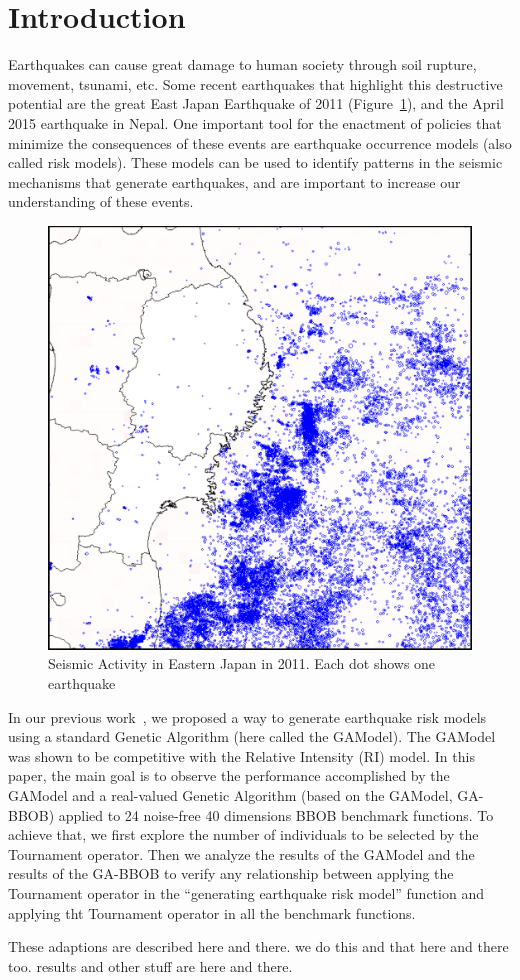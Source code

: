 \section{Introduction}\label{intro}

Earthquakes can cause great damage to human society through soil
rupture, movement, tsunami, etc. Some recent earthquakes that
highlight this destructive potential are the great East Japan
Earthquake of 2011 (Figure~\ref{GreatEastJapan}), and the
April 2015 earthquake in Nepal. One important tool for the enactment
of policies that minimize the consequences of these events are
earthquake occurrence models (also called risk models). These models
can be used to identify patterns in the seismic mechanisms that
generate earthquakes, and are important to increase our understanding
of these events.


\begin{figure}[]
\centering
\includegraphics[width=.45\textwidth]{img/earthquakes2011.png}
\caption{Seismic Activity in Eastern Japan in 2011. Each dot
  shows one earthquake}
\label{GreatEastJapan}
\end{figure}

In our previous work~\cite{ecta14}, we proposed a way to generate
earthquake risk models using a standard Genetic Algorithm (here called
the GAModel). The GAModel was shown to be competitive with the
Relative Intensity (RI) model. In this paper, the main goal is to observe the performance accomplished by the GAModel and a real-valued Genetic Algorithm (based on the GAModel, GA-BBOB) applied to 24 noise-free 40 dimensions BBOB benchmark functions. To achieve that, we first explore the number of individuals to be selected by the Tournament operator. Then we analyze the results of the GAModel and the results of the GA-BBOB to verify any relationship between applying the Tournament operator in the ``generating earthquake risk model'' function and applying tht Tournament operator in all the benchmark functions.


These adaptions are described here and there. we do this and that here and there too. results and other stuff are here and there.